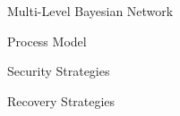 \begin{frame}{Multi-Level Bayesian Network}
\end{frame}

\begin{frame}{Process Model}
\end{frame}

\begin{frame}{Security Strategies}
\end{frame}

\begin{frame}{Recovery Strategies}

\end{frame}